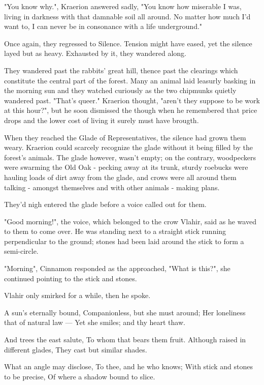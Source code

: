 "You know why.", Kraerion answered sadly, "You know how miserable I was, living in darkness with that damnable soil all around. No matter how much I'd want to, I can never be in consonance with a life underground."

Once again, they regressed to Silence. Tension might have eased, yet the silence layed but as heavy. Exhausted by it, they wandered along.

They wandered past the rabbits' great hill, thence past the clearings which constitute the central part of the forest. Many an animal laid leasurly basking in the morning sun and they watched curiously as the two chipmunks quietly wandered past. "That's queer." Kraerion thought, "aren't they suppose to be work at this hour?", but he soon dismissed the though when he remembered that price drops and the lower cost of living it surely must have brougth. %

When they reached the Glade of Representatives, the silence had grown them weary. Kraerion could scarcely recognize the glade without it being filled by the forest's animals. The glade however, wasn't empty; on the contrary, woodpeckers were swarming the Old Oak - pecking away at its trunk, sturdy roebucks were hauling loads of dirt away from the glade, and crows were all around them talking - amongst themselves and with other animals - making plans. 

They'd nigh entered the glade before a voice called out for them.

"Good morning!", the voice, which belonged to the crow Vlahir, said as he waved to them to come over. He was standing next to a straight stick running perpendicular to the ground; stones had been laid around the stick to form a semi-circle. 

"Morning", Cinnamon responded as the approached, "What is this?", she continued pointing to the stick and stones.

Vlahir only smirked for a while, then he spoke.

	A sun's eternally bound,
	Companionless, but she must around;
	Her loneliness that of natural law —
	Yet she smiles; and thy heart thaw.

	And trees the east salute,
	To whom that bears them fruit.
	Although raised in different glades,
	They cast but similar shades.

	What an angle may disclose,
	To thee, and he who knows; %
	With stick and stones to be precise,
	Of where a shadow bound to slice.


